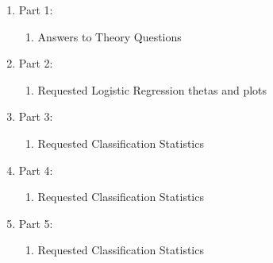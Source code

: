 \documentclass[12pt]{article}
\begin{document}
\begin{enumerate}
\item Part 1:
	\begin{enumerate}
	\item Answers to Theory Questions
	\end{enumerate}
\item Part 2:
	\begin{enumerate}
	\item Requested Logistic Regression thetas and plots
	\end{enumerate}
\item Part 3:
	\begin{enumerate}
	\item Requested Classification Statistics
	\end{enumerate}
\item Part 4:
	\begin{enumerate}
	\item Requested Classification Statistics
	\end{enumerate}
\item Part 5:
	\begin{enumerate}
	\item Requested Classification Statistics
	\end{enumerate}
\end{enumerate}
\end{document}
